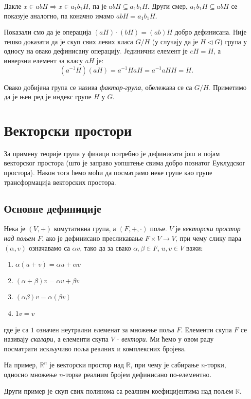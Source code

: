 \documentclass{report}
\theoremstyle{plain}
\theoremstyle{definition}
\begin{document}
Дакле $x\in abH \Rightarrow x\in a_1b_1H$, па  је $abH \subseteq a_1b_1H$. Други смер, $a_1 b_1 H \subseteq abH$ се показује аналогно, па коначно имамо $abH = a_1b_1H$.

Показали смо да је операција $(aH)\cdot (bH) = (ab)H$ добро дефинисана. Није тешко доказати да је скуп свих левих класа $G/H$ (у случају да је $H\lhd G$) група у односу на овако дефинисану операцију. Јединични елемент је $eH = H$, а инверзни елемент за класу $aH$ је:
$$(a^{-1}H)(aH) = a^{-1}HaH = a^{-1}aHH = H.$$

Овако добијена група се назива \emph{фактор-група}, обележава се са $G/H$. Приметимо да је њен ред је индекс групе $H$ у $G$.

\chapter{Векторски простори}
За примену теорије група у физици потребно је дефинисати још и појам векторског простора (што је заправо уопштење свима добро познатог Еуклудског простора). Након тога ћемо моћи да посматрамо неке групе као групе трансформација векторских простора.
\section{Основне дефиниције}
Нека је $(V, +)$ комутативна група, а $(F, +, \cdot)$ поље. $V$ је \emph{векторски простор над пољем} $F$, ако је дефинисано пресликавање $F\times V\to V$, при чему слику пара $(\alpha, v)$ означавамо са $\alpha v$, тако да за свако $\alpha, \beta \in F$, $u, v\in V$ важи:
\begin{enumerate}
\item $\alpha(u+v) = \alpha u+\alpha v$
\item $(\alpha + \beta)v = \alpha v+ \beta v$
\item $(\alpha\beta)v = \alpha(\beta v)$
\item $1v = v$
\end{enumerate}
где је са $1$ означен неутрални елеменат за множење поља $F$. Елементи скупа $F$ се називају \emph{скалари}, а елементи скупа $V$ - \emph{вектори}. Ми ћемо у овом раду посматрати искључиво поља реалних и комплексних бројева.

На пример, $\mathbb{R}^n$ је векторски простор над $\mathbb{R}$, при чему је сабирање $n$-торки, односно множење $n$-торке реалним бројем дефинисано по-елементно.

Други пример је скуп свих полинома са реалним коефицијентима над пољем $\mathbb{R}$.
\end{document}
